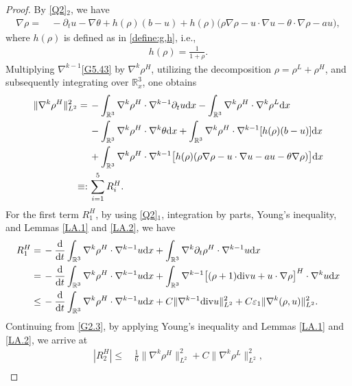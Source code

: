 \documentclass[reqno,11pt]{amsart}
\theoremstyle{plain}
\numberwithin{equation}{section}
\newcommand{\eps}{{\varepsilon}}
\begin{document}
\begin{proof}
By \eqref{Q2}$_2$, we have  
\begin{align}  \label{G5.43}
 \nabla \rho  =&\, -\partial_t u-\nabla\theta+h(\rho)(b - u)+h(\rho)\big(\rho\nabla\rho-u\cdot\nabla u-\theta\cdot\nabla\rho- au\big),  
\end{align}  
where  $h(\rho)$ is defined as in \eqref{define:g,h}, i.e., 
\begin{gather*}  
h(\rho) = \frac{1}{1+\rho}.
\end{gather*}  
Multiplying $\nabla^{k-1}$\eqref{G5.43} by $\nabla^k \rho^H$, utilizing the decomposition $\rho= \rho^L  + \rho^H $, and subsequently integrating   over $\mathbb{R}^3_x$, one obtains
\begin{align}\label{G5.44}
 \|\nabla^k\rho^H\|_{L^2}^2 
=\,&-\int_{\mathbb{R}^3} \nabla^k \rho^H\cdot \nabla^{k-1}\partial_t u{\rm d}x-\int_{\mathbb{R}^3} \nabla^k \rho^H\cdot \nabla^k \rho^L{\rm d}x\nonumber\\
&-\int_{\mathbb{R}^3}\nabla^k\rho^H\cdot\nabla^k \theta{\rm d}x+\int_{\mathbb{R}^3} \nabla^k \rho^H\cdot \nabla^{k-1}[h(\rho)(b-u)]{\rm d}x\nonumber\\
&+\int_{\mathbb{R}^3} \nabla^k \rho^H\cdot\nabla^{k-1}\big[h(\rho)(\rho\nabla\rho-u\cdot\nabla u-au-\theta\nabla\rho)\big]{\rm d}x\nonumber\\
\equiv:\,& \sum_{i=1}^5 R_i^H.
\end{align} 
For the first term $R_1^H$, by using \eqref{Q2}$_1$, integration by parts, Young's inequality, and Lemmas \ref{LA.1} and \ref{LA.2}, we have
\begin{align}\label{G5.45}
R_1^H=&\, -\frac{{\rm d}}{{\rm d}t}\int_{\mathbb{R}^3} \nabla^k \rho^H\cdot\nabla^{k-1} u{\rm d}x +\int_{\mathbb{R}^3} \nabla^k
\partial_t \rho^H\cdot\nabla^{k-1}u {\rm d}x\nonumber\\
=&\,-\frac{{\rm d}}{{\rm d}t}\int_{\mathbb{R}^3} \nabla^k \rho^H\cdot\nabla^{k-1} u{\rm d}x+\int_{\mathbb{R}^3}\nabla^{k-1}\big[(\rho+1){\rm div}u+u\cdot\nabla\rho      \big]^H\cdot\nabla^k u{\rm d}x\nonumber\\
\leq&\,-\frac{{\rm d}}{{\rm d}t}\int_{\mathbb{R}^3} \nabla^k \rho^H\cdot\nabla^{k-1} u{\rm d}x+C\|\nabla^{k-1} {\rm div}u\|_{L^2}^2+C\eps_1\|\nabla^k (\rho, u)\|_{L^2}^2.
\end{align}
Continuing from \eqref{G2.3}, by applying   Young's inequality and Lemmas \ref{LA.1} and \ref{LA.2}, we arrive at  
\begin{align}
|R_2^H|\leq&\, \frac{1}{6} \|\nabla^k \rho^H\|_{L^2}^2+C \|\nabla^k \rho^L\|_{L^2}^2, \label{G5.46-1} \\

\end{align}
\end{proof}
\end{document}
